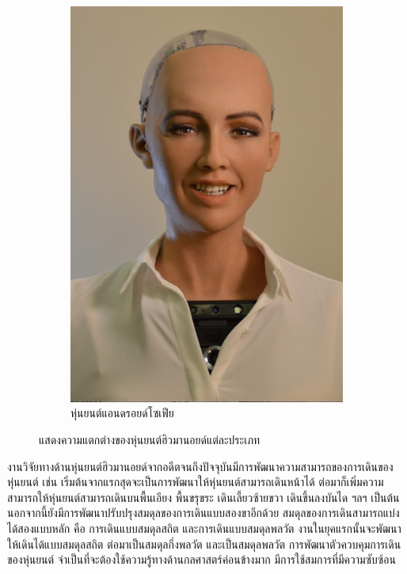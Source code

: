\begin{figure}[!ht]
\begin{subfigure}[b]{0.3\textwidth}
        \includegraphics[width=\textwidth]{chapter2/images/โซเฟีย.jpg}
        \caption{หุ่นยนต์แอนดรอยด์โซเฟีย}
        \label{fig:sophia}
    \end{subfigure}
    \caption{แสดงความแตกต่างของหุ่นยนต์ฮิวมานอยด์แต่ละประเภท}
    \label{fig:diff_humanoid}
\end{figure}

\clearpage
งานวิจัยทางด้านหุ่นยนต์ฮิวมานอยด์จากอดีตจนถึงปัจจุบันมีการพัฒนาความสามารถของการเดินของหุ่นยนต์
เช่น เริ่มต้นจากแรกสุดจะเป็นการพัฒนาให้หุ่นยนต์สามารถเดินหน้าได้ ต่อมาก็เพิ่มความสามารถให้หุ่นยนต์สามารถเดินบนพื้นเอียง พื้นขรุขระ
เดินเลี้ยวซ้ายขวา เดินขึ้นลงบันได ฯลฯ เป็นต้น นอกจากนี้ยังมีการพัฒนาปรับปรุงสมดุลของการเดินแบบสองขาอีกด้วย สมดุลของการเดินสามารถแบ่งได้สองแบบหลัก
คือ การเดินแบบสมดุลสถิต และการเดินแบบสมดุลพลวัต งานในยุคแรกนั้นจะพัฒนาให้เดินได้แบบสมดุลสถิต ต่อมาเป็นสมดุลกึ่งพลวัต
และเป็นสมดุลพลวัต การพัฒนาตัวควบคุมการเดินของหุ่นยนต์ จำเป็นที่จะต้องใช้ความรู้ทางด้านกลศาสตร์ค่อนข้างมาก มีการใช้สมการที่มีความซับซ้อน

